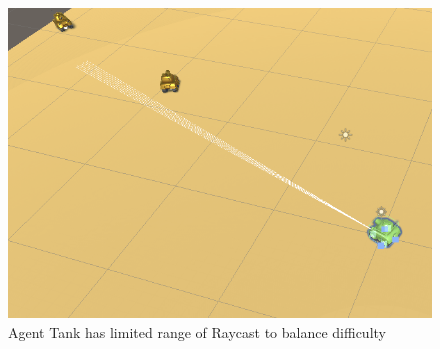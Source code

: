 \begin{figure}[t]
\begin{multicols}{3}
\includegraphics[width=0.99\columnwidth]{Chapter2/Raycast.png}\par
\caption{Agent Tank has limited range of Raycast to balance difficulty}
\label{fig:rays}
\end{multicols}
\end{figure}